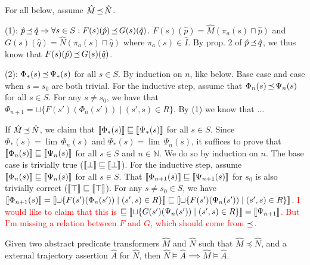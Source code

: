 For all below, assume $\hat M \operatorname{\mathrel{\preceq}} \hat N$.

(1): $\hat p \operatorname{\mathrel{\preceq}} \hat q \Rightarrow \forall s \in S : F(s)(\hat p) \operatorname{\mathrel{\preceq}} G(s)(\hat q)$. $F(s)(\hat p) = \hat M(\pi_{a}(s) \sqcap \hat p)$ and $G(s)(\hat q) = \hat N(\pi_{a}(s) \sqcap \hat q)$ where $\pi_{a}(s) \in \hat I$. By prop. 2 of $\hat p \operatorname{\mathrel{\preceq}} \hat q$, we thus know that $F(s)(\hat p) \operatorname{\mathrel{\preceq}} G(s)(\hat q)$.

(2): $\Phi_{*}(s) \operatorname{\mathrel{\preceq}} \Psi_{*}(s)$ for all $s \in S$. By induction on $n$, like below. Base case and case when $s = s_{0}$ are both trivial. For the inductive step, assume that $\Phi_{n}(s) \operatorname{\mathrel{\preceq}} \Psi_{n}(s)$ for all $s \in S$. For any $s \neq s_{0}$, we have that $\Phi_{n+1} = \sqcup \{ F(s')(\Phi_{n}(s')) \mid (s',s) \in R \}$. By (1) we know that ...

If $\hat M \operatorname{\mathrel{\preceq}} \hat N$, we claim that $\llbracket\Phi_{*}(s)\rrbracket \sqsubseteq \llbracket\Psi_{*}(s)\rrbracket$ for all $s \in S$. Since $\Phi_{*}(s) = \lim \, \Phi_{n}(s)$ and $\Psi_{*}(s) = \lim \, \Psi_{n}(s)$, it suffices to prove that $\llbracket\Phi_{n}(s)\rrbracket \sqsubseteq \llbracket\Psi_{n}(s)\rrbracket$ for all $s \in S$ and $n \in \mathbb{N}$. We do so by induction on $n$. The base case is trivially true ($\llbracket\bot\rrbracket \sqsubseteq \llbracket\bot\rrbracket$). For the inductive step, assume $\llbracket\Phi_{n}(s)\rrbracket \sqsubseteq \llbracket\Psi_{n}(s)\rrbracket$ for all $s \in S$. That $\llbracket\Phi_{n+1}(s)\rrbracket \sqsubseteq \llbracket\Psi_{n+1}(s)\rrbracket$ for $s_{0}$ is also trivially correct ($\llbracket\top\rrbracket \sqsubseteq \llbracket\top\rrbracket$). For any $s \neq s_{0} \in S$, we have $\llbracket\Phi_{n+1}(s)\rrbracket = \llbracket\sqcup \{ F(s')(\Phi_{n}(s')) \mid (s',s) \in R \}\rrbracket \sqsubseteq \llbracket\sqcup \{ F(s')(\Psi_{n}(s')) \mid (s',s) \in R \}\rrbracket$. \textcolor{red}{I would like to claim that this is $\sqsubseteq \llbracket\sqcup \{ G(s')(\Psi_{n}(s')) \mid (s',s) \in R \}\rrbracket = \llbracket\Psi_{n+1}\rrbracket$. But I'm missing a relation between $F$ and $G$, which should come from $\operatorname{\mathrel{\preceq}}$.}

\begin{theorem}
Given two abstract predicate transformers $\hat M$ and $\hat N$ such that $\hat M \preceq \hat N$, and a external trajectory assertion $\hat A$ for $\hat N$, then $\hat N \models \hat A \implies \hat M \models \hat A$.
\end{theorem}


